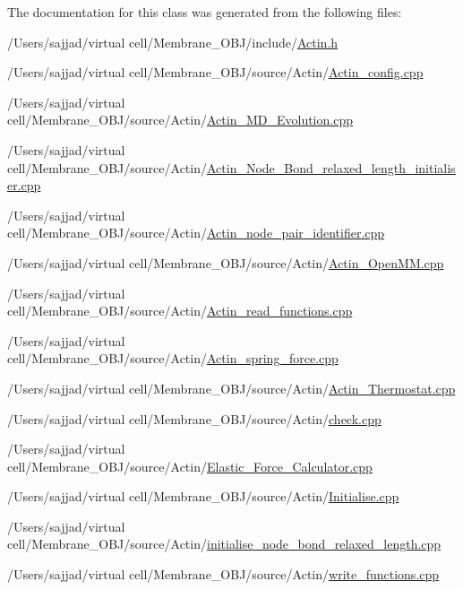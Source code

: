 The documentation for this class was generated from the following files\+:\begin{DoxyCompactItemize}
\item 
/\+Users/sajjad/virtual cell/\+Membrane\+\_\+\+O\+B\+J/include/\mbox{\hyperlink{Actin_8h}{Actin.\+h}}\item 
/\+Users/sajjad/virtual cell/\+Membrane\+\_\+\+O\+B\+J/source/\+Actin/\mbox{\hyperlink{Actin__config_8cpp}{Actin\+\_\+config.\+cpp}}\item 
/\+Users/sajjad/virtual cell/\+Membrane\+\_\+\+O\+B\+J/source/\+Actin/\mbox{\hyperlink{Actin__MD__Evolution_8cpp}{Actin\+\_\+\+M\+D\+\_\+\+Evolution.\+cpp}}\item 
/\+Users/sajjad/virtual cell/\+Membrane\+\_\+\+O\+B\+J/source/\+Actin/\mbox{\hyperlink{Actin__Node__Bond__relaxed__length__initialiser_8cpp}{Actin\+\_\+\+Node\+\_\+\+Bond\+\_\+relaxed\+\_\+length\+\_\+initialiser.\+cpp}}\item 
/\+Users/sajjad/virtual cell/\+Membrane\+\_\+\+O\+B\+J/source/\+Actin/\mbox{\hyperlink{Actin__node__pair__identifier_8cpp}{Actin\+\_\+node\+\_\+pair\+\_\+identifier.\+cpp}}\item 
/\+Users/sajjad/virtual cell/\+Membrane\+\_\+\+O\+B\+J/source/\+Actin/\mbox{\hyperlink{Actin__OpenMM_8cpp}{Actin\+\_\+\+Open\+M\+M.\+cpp}}\item 
/\+Users/sajjad/virtual cell/\+Membrane\+\_\+\+O\+B\+J/source/\+Actin/\mbox{\hyperlink{Actin__read__functions_8cpp}{Actin\+\_\+read\+\_\+functions.\+cpp}}\item 
/\+Users/sajjad/virtual cell/\+Membrane\+\_\+\+O\+B\+J/source/\+Actin/\mbox{\hyperlink{Actin__spring__force_8cpp}{Actin\+\_\+spring\+\_\+force.\+cpp}}\item 
/\+Users/sajjad/virtual cell/\+Membrane\+\_\+\+O\+B\+J/source/\+Actin/\mbox{\hyperlink{Actin__Thermostat_8cpp}{Actin\+\_\+\+Thermostat.\+cpp}}\item 
/\+Users/sajjad/virtual cell/\+Membrane\+\_\+\+O\+B\+J/source/\+Actin/\mbox{\hyperlink{Actin_2check_8cpp}{check.\+cpp}}\item 
/\+Users/sajjad/virtual cell/\+Membrane\+\_\+\+O\+B\+J/source/\+Actin/\mbox{\hyperlink{Actin_2Elastic__Force__Calculator_8cpp}{Elastic\+\_\+\+Force\+\_\+\+Calculator.\+cpp}}\item 
/\+Users/sajjad/virtual cell/\+Membrane\+\_\+\+O\+B\+J/source/\+Actin/\mbox{\hyperlink{Actin_2Initialise_8cpp}{Initialise.\+cpp}}\item 
/\+Users/sajjad/virtual cell/\+Membrane\+\_\+\+O\+B\+J/source/\+Actin/\mbox{\hyperlink{initialise__node__bond__relaxed__length_8cpp}{initialise\+\_\+node\+\_\+bond\+\_\+relaxed\+\_\+length.\+cpp}}\item 
/\+Users/sajjad/virtual cell/\+Membrane\+\_\+\+O\+B\+J/source/\+Actin/\mbox{\hyperlink{Actin_2write__functions_8cpp}{write\+\_\+functions.\+cpp}}\end{DoxyCompactItemize}
